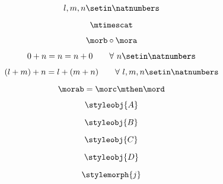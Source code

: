 {\begin{forslides}
        \begin{equation}
            \label{eq:semicats-slides-41}
            l, m, n \setin \natnumbers
        \end{equation}

        \begin{equation}
            \label{eq:semicats-slides-42}
            \mtimescat
        \end{equation}

        \begin{equation}
            \label{eq:semicats-slides-43}
            \morb \circ \mora
        \end{equation}

        \begin{equation}
            \label{eq:semicats-slides-44}
            0 + n = n = n + 0   \quad \quad \forall \ n \setin \natnumbers
        \end{equation}

        \begin{equation}
            \label{eq:semicats-slides-45}
            (l + m) + n = l + (m + n) \quad \quad  \forall \ l, m, n \setin \natnumbers
        \end{equation}

        \begin{equation}
            \label{eq:semicats-slides-46}
            \morab = \morc \mthen \mord
        \end{equation}

        \begin{equation}
            \label{eq:semicats-slides-47}
            \styleobj{A}
        \end{equation}

        \begin{equation}
            \label{eq:semicats-slides-48}
            \styleobj{B}
        \end{equation}

        \begin{equation}
            \label{eq:4semicats-slides-9}
            \styleobj{C}
        \end{equation}

        \begin{equation}
            \label{eq:semicats-slides-50}
            \styleobj{D}
        \end{equation}

        \begin{equation}
            \label{eq:semicats-slides-51}
            \stylemorph{j}
        \end{equation}


\end{forslides}}
